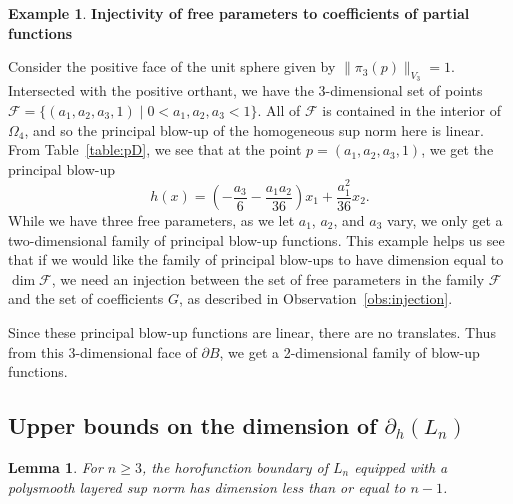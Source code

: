\documentclass{article}
\newtheorem{lemma}[theorem]{Lemma}
\theoremstyle{definition}
\newtheorem{ex}[theorem]{Example}
\newcommand{\norm}[1]{\|#1\|}
\newcommand{\bhor}{\partial_h}
\newcommand{\cF}{{\mathcal F}}
\begin{document}
\begin{ex}\textbf{Injectivity of free parameters to coefficients of partial functions}\label{ex:injection}

Consider the positive face of the unit sphere given by $\norm{\pi_3(p)}_{V_3} = 1$. Intersected with the positive orthant, we have the 3-dimensional set of points $\cF =\{(a_1,a_2,a_3,1)\mid 0< a_1, a_2, a_3 <1\}$. All of $\cF$ is contained in the interior of $\Omega_4$, and so the principal blow-up of the homogeneous sup norm here is linear. From Table~\ref{table:pD}, we see that at the point $p = (a_1, a_2, a_3, 1)$, we get the principal blow-up
\[
h(x) = \left(-\frac{a_3}{6} - \frac{a_1a_2}{36}\right) x_1 + \frac{a_1^2}{36}x_2.
\]
While we have three free parameters, as we let $a_1$, $a_2$, and $a_3$ vary, we only get a two-dimensional family of principal blow-up functions. This example helps us see that if we would like the family of principal blow-ups to have dimension equal to $\dim \cF$, we need an injection between the set of free parameters in the family $\cF$ and the set of coefficients $G$, as described in Observation~\ref{obs:injection}. 

Since these principal blow-up functions are linear, there are no translates. Thus from this 3-dimensional face of $\partial B$, we get a 2-dimensional family of blow-up functions.
\end{ex}

\subsection{Upper bounds on the dimension of $\bhor(L_n)$}\label{sec-upperbounds}

\begin{lemma}\label{lem:n-1}
For $n\geq 3$, the horofunction boundary of $L_n$ equipped with a polysmooth layered sup norm has dimension less than or equal to $n-1$.
\end{lemma}
\end{document}
